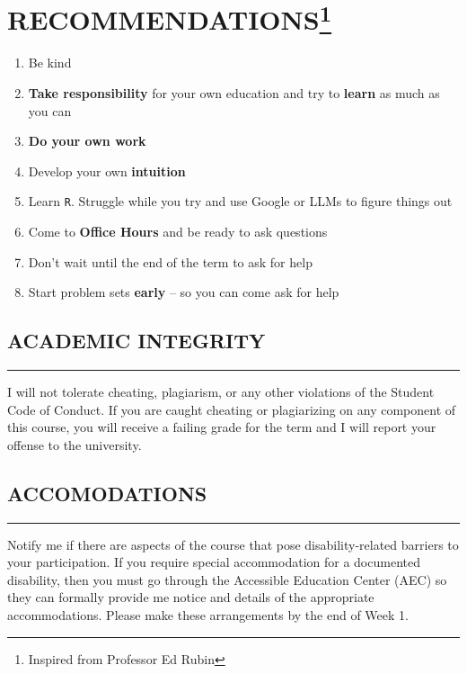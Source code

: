 \section*{RECOMMENDATIONS\footnote{Inspired from Professor Ed Rubin}}

\begin{enumerate}
    \item Be kind
    \item \textbf{Take responsibility} for your own education and try to \textbf{learn} as much as you can
    \item \textbf{Do your own work}
    \item Develop your own \textbf{intuition}
    \item Learn \texttt{R}. Struggle while you try and use Google or LLMs to figure things out
    \item Come to \textbf{Office Hours} and be ready to ask questions
    \item Don't wait until the end of the term to ask for help
    \item Start problem sets \textbf{early} -- so you can come ask for help
\end{enumerate}

\subsection*{ACADEMIC INTEGRITY}
\vspace*{-0.5cm}
\rule{\textwidth}{2pt}

I will not tolerate cheating, plagiarism, or any other violations of the Student Code of Conduct. 
If you are caught cheating or plagiarizing on any component of this course, you will receive a failing grade for the term and I will report your offense to the university. 

\subsection*{ACCOMODATIONS}
\vspace*{-0.5cm}
\rule{\textwidth}{2pt}

Notify me if there are aspects of the course that pose disability-related barriers to your participation. 
If you require special accommodation for a documented disability, then you must go through the Accessible Education Center (AEC) so they can formally provide me notice and details of the appropriate accommodations. 
Please make these arrangements by the end of Week 1.